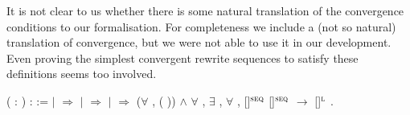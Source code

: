 It is not clear to us whether there is some natural translation of the
convergence conditions to our formalisation.
For completeness we include a (not so natural) translation of
convergence, but we were not able to use it in our development. Even
proving the simplest convergent rewrite sequences to satisfy these
definitions seems too involved.
\begin{singlespace}
\begin{coqdoccode}
\coqdocnoindent
{}
  (\coqdocvar{$\varphi$} : 
 ) :
:=\coqdoceol
\coqdocindent{1.00em}
 \coqdocvariable{$\varphi$} \coqdoceol
\coqdocindent{1.00em}
\ensuremath{|} 
\coqdocvar{\_}          \ensuremath{\Rightarrow}
\coqdoceol
\coqdocindent{1.00em}
\ensuremath{|} 
\coqdocvar{\_} \coqdocvar{\_} \coqdocvar{$\psi$} \coqdocvar{\_}
\coqdocvar{\_} \ensuremath{\Rightarrow}
\coqdocvariable{$\psi$}\coqdoceol
\coqdocindent{1.00em}
\ensuremath{|} 
\coqdocvar{\_} \coqdocvar{\_}  
\coqdocvar{\_}  \ensuremath{\Rightarrow}
(\ensuremath{\forall} ,
( )) \ensuremath{\land}\coqdoceol
\coqdocindent{2.00em}
\ensuremath{\forall} , \ensuremath{\exists}
\coqdocvar{$\iota$}, \ensuremath{\forall} \coqdocvar{$\kappa$},\coqdoceol
\coqdocindent{3.00em}
\coqdocvariable{$\varphi$}[\coqdocvariable{$\iota$}]$^\textsc{seq}$ 
\coqdocvariable{$\varphi$}[\coqdocvariable{$\kappa$}]$^\textsc{seq}$
\ensuremath{\rightarrow}
\coqdocvariable{$\varphi$}[\coqdocvariable{$\kappa$}]$^\textsc{l}$
\coqdoceol
\coqdocindent{1.00em}
.\coqdoceol
\coqdocemptyline
\coqdocnoindent
{}

\end{coqdoccode}
\end{singlespace}
